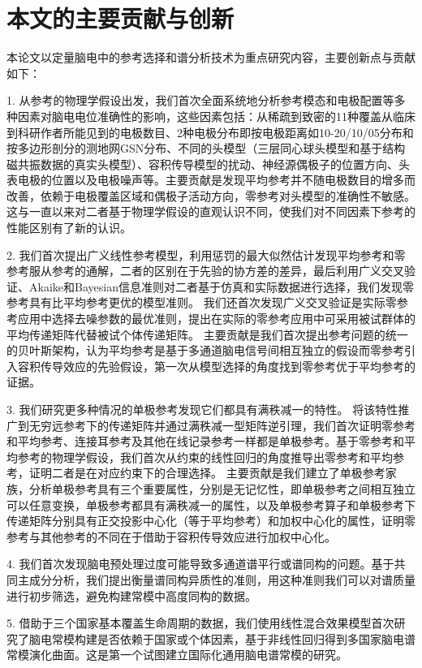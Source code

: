 \section{本文的主要贡献与创新}
本论文以定量脑电中的参考选择和谱分析技术为重点研究内容，主要创新点与贡献如下：

1. 从参考的物理学假设出发，我们首次全面系统地分析参考模态和电极配置等多种因素对脑电电位准确性的影响，这些因素包括：从稀疏到致密的11种覆盖从临床到科研作者所能见到的电极数目、2种电极分布即按电极距离如10-20/10/05分布和按多边形剖分的测地网GSN分布、不同的头模型（三层同心球头模型和基于结构磁共振数据的真实头模型）、容积传导模型的扰动、神经源偶极子的位置方向、头表电极的位置以及电极噪声等。主要贡献是发现平均参考并不随电极数目的增多而改善，依赖于电极覆盖区域和偶极子活动方向，零参考对头模型的准确性不敏感。这与一直以来对二者基于物理学假设的直观认识不同，使我们对不同因素下参考的性能区别有了新的认识。

2. 我们首次提出广义线性参考模型，利用惩罚的最大似然估计发现平均参考和零参考服从参考的通解，二者的区别在于先验的协方差的差异，最后利用广义交叉验证、Akaike和Bayesian信息准则对二者基于仿真和实际数据进行选择，我们发现零参考具有比平均参考更优的模型准则。 我们还首次发现广义交叉验证是实际零参考应用中选择去噪参数的最优准则，提出在实际的零参考应用中可采用被试群体的平均传递矩阵代替被试个体传递矩阵。 主要贡献是我们首次提出参考问题的统一的贝叶斯架构，认为平均参考是基于多通道脑电信号间相互独立的假设而零参考引入容积传导效应的先验假设，第一次从模型选择的角度找到零参考优于平均参考的证据。

3. 我们研究更多种情况的单极参考发现它们都具有满秩减一的特性。 将该特性推广到无穷远参考下的传递矩阵并通过满秩减一型矩阵逆引理，我们首次证明零参考和平均参考、连接耳参考及其他在线记录参考一样都是单极参考。基于零参考和平均参考的物理学假设，我们首次从约束的线性回归的角度推导出零参考和平均参考，证明二者是在对应约束下的合理选择。 主要贡献是我们建立了单极参考家族，分析单极参考具有三个重要属性，分别是无记忆性，即单极参考之间相互独立可以任意变换，单极参考都具有满秩减一的属性，以及单极参考算子和单极参考下传递矩阵分别具有正交投影中心化（等于平均参考）和加权中心化的属性，证明零参考与其他参考的不同在于借助于容积传导效应进行加权中心化。

4. 我们首次发现脑电预处理过度可能导致多通道谱平行或谱同构的问题。基于共同主成分分析，我们提出衡量谱同构异质性的准则，用这种准则我们可以对谱质量进行初步筛选，避免构建常模中高度同构的数据。

5. 借助于三个国家基本覆盖生命周期的数据，我们使用线性混合效果模型首次研究了脑电常模构建是否依赖于国家或个体因素，基于非线性回归得到多国家脑电谱常模演化曲面。这是第一个试图建立国际化通用脑电谱常模的研究。

